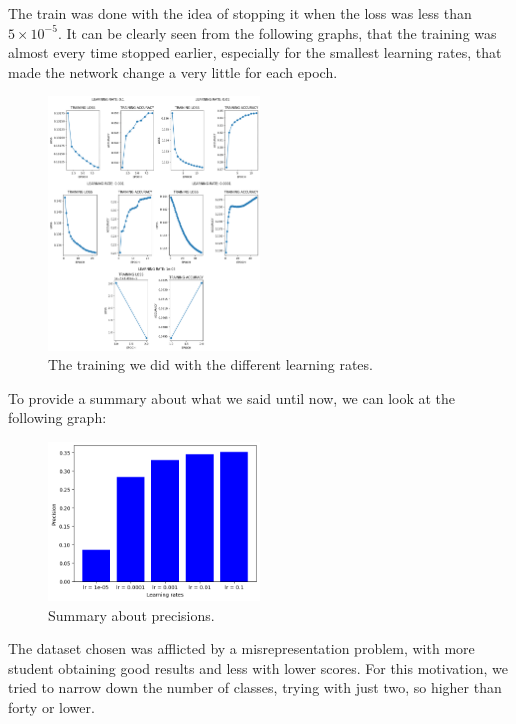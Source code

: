 \documentclass{article}
\begin{document}
The train was done with the idea of stopping it when the loss was less than $5 \times 10^{-5}$. It can be clearly seen from the following graphs, that the training was almost every time stopped earlier,
especially for the smallest learning rates, that made the network change a very little for each epoch.

\begin{figure}
    \centering
    \includegraphics[width=0.5\textwidth]{lr_training.png}
    \caption{\label{fig:lr}The training we did with the different learning rates.}
\end{figure}

To provide a summary about what we said until now, we can look at the following graph:

\begin{figure}
    \centering
    \includegraphics[width=0.5\textwidth]{results.png}
    \caption{\label{fig:summary}Summary about precisions.}
\end{figure}

The dataset chosen was afflicted by a misrepresentation problem, with more student obtaining good results and less with lower scores. For this motivation, we tried to narrow down the number of classes,
trying with just two, so higher than forty or lower.
\end{document}
